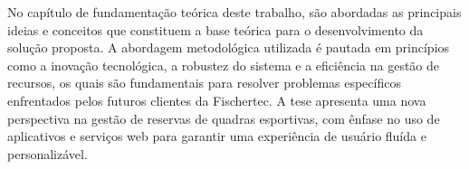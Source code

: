 


No capítulo de fundamentação teórica deste trabalho, são abordadas as principais ideias e conceitos que constituem a base teórica para o desenvolvimento da solução proposta. A abordagem metodológica utilizada é pautada em princípios como a inovação tecnológica, a robustez do sistema e a eficiência na gestão de recursos, os quais são fundamentais para resolver problemas específicos enfrentados pelos futuros clientes da Fischertec. A tese apresenta uma nova perspectiva na gestão de reservas de quadras esportivas, com ênfase no uso de aplicativos e serviços web para garantir uma experiência de usuário fluída e personalizável.

